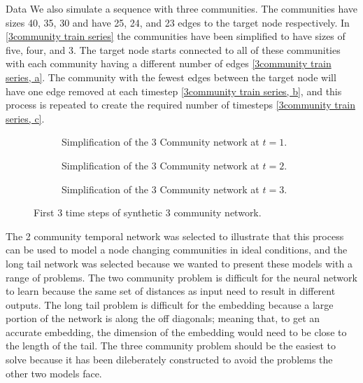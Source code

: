 \documentclass{article}
\begin{document}
\begin{section}{Data}
    We also simulate a sequence with three communities. The communities have sizes 40, 35, 30 and have 25, 24, and 23 edges to the target node respectively. In \autoref{3community train series} the communities have been simplified to have sizes of five, four, and 3. The target node starts connected to all of these communities with each community having a different number of edges \autoref{3community train series, a}. The community with the fewest edges between the target node will have one edge removed at each timestep \autoref{3community train series, b}, and this process is repeated to create the required number of timesteps \autoref{3community train series, c}.  
    \begin{figure}[H]
        \centering
        \centering
        \begin{subfigure}[c]{0.3\textwidth}
            \centering
            \resizebox{.6\width}{!}{}
            \caption{Simplification of the 3 Community network at $t=1$.}
            \label{3community train series, a}
        \end{subfigure}
        \hfill
        \centering
        \begin{subfigure}[c]{0.3\textwidth}
            \centering
            \resizebox{.6\width}{!}{}
            \caption{Simplification of the 3 Community network at $t=2$.}
            \label{3community train series, b}            
        \end{subfigure}
        \hfill
        \centering
        \begin{subfigure}[c]{0.3\textwidth}
            \centering
            \resizebox{.6\width}{!}{}
            \caption{Simplification of the 3 Community network at $t=3$.}
            \label{3community train series, c}
        \end{subfigure}
        \caption{First 3 time steps of synthetic 3 community network.}
        \label{3community train series}
    \end{figure}
    The 2 community temporal network was selected to illustrate that this process can be used to model a node changing communities in ideal conditions, and the long tail network was selected because we wanted to present these models with a range of problems. The two community problem is difficult for the neural network to learn because the same set of distances as input need to result in different outputs. The long tail problem is difficult for the embedding because a large portion of the network is along the off diagonals; meaning that, to get an accurate embedding, the dimension of the embedding would need to be close to the length of the tail. The three community problem should be the easiest to solve because it has been dileberately constructed to avoid the problems the other two models face.

\end{section}
\end{document}
